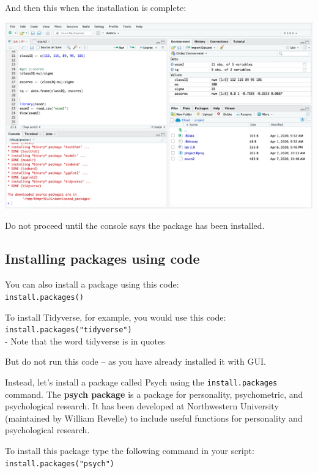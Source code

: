\documentclass[
]{book}
\begin{document}
And then this when the installation is complete:

\includegraphics{img/instload3.png}

Do not proceed until the console says the package has been installed.

\hypertarget{installing-packages-using-code}{%
\subsection{Installing packages using code}\label{installing-packages-using-code}}

You can also install a package using this code:\\
\texttt{install.packages()}

To install Tidyverse, for example, you would use this code:\\
\texttt{install.packages("tidyverse")}~\\
- Note that the word tidyverse is in quotes

But do not run this code -- as you have already installed it with GUI.

Instead, let's install a package called Psych using the \texttt{install.packages} command. The \textbf{psych package} is a package for personality, psychometric, and psychological research. It has been developed at Northwestern University (maintained by William Revelle) to include useful functions for personality and psychological research.

To install this package type the following command in your script:\\
\texttt{install.packages("psych")}
\end{document}
